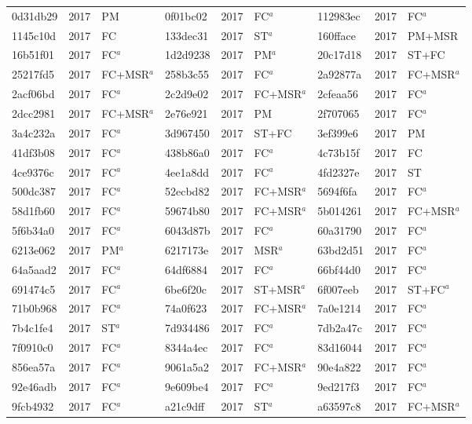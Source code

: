 \begin{longtable}{lll@{\hspace{10pt}}lll@{\hspace{10pt}}lll}
0d31db29 & 2017 & PM & 0f01bc02 & 2017 & FC$^{a}$ & 112983ec & 2017 & FC$^{a}$ \\
1145c10d & 2017 & FC & 133dec31 & 2017 & ST$^{a}$ & 160fface & 2017 & PM+MSR \\
16b51f01 & 2017 & FC$^{a}$ & 1d2d9238 & 2017 & PM$^{a}$ & 20c17d18 & 2017 & ST+FC \\
25217fd5 & 2017 & FC+MSR$^{a}$ & 258b3c55 & 2017 & FC$^{a}$ & 2a92877a & 2017 & FC+MSR$^{a}$ \\
2acf06bd & 2017 & FC$^{a}$ & 2c2d9e02 & 2017 & FC+MSR$^{a}$ & 2cfeaa56 & 2017 & FC$^{a}$ \\
2dcc2981 & 2017 & FC+MSR$^{a}$ & 2e76e921 & 2017 & PM & 2f707065 & 2017 & FC$^{a}$ \\
3a4c232a & 2017 & FC$^{a}$ & 3d967450 & 2017 & ST+FC & 3ef399e6 & 2017 & PM \\
41df3b08 & 2017 & FC$^{a}$ & 438b86a0 & 2017 & FC$^{a}$ & 4c73b15f & 2017 & FC \\
4ce9376c & 2017 & FC$^{a}$ & 4ee1a8dd & 2017 & FC$^{a}$ & 4fd2327e & 2017 & ST \\
500dc387 & 2017 & FC$^{a}$ & 52ecbd82 & 2017 & FC+MSR$^{a}$ & 5694f6fa & 2017 & FC$^{a}$ \\
58d1fb60 & 2017 & FC$^{a}$ & 59674b80 & 2017 & FC+MSR$^{a}$ & 5b014261 & 2017 & FC+MSR$^{a}$ \\
5f6b34a0 & 2017 & FC$^{a}$ & 6043d87b & 2017 & FC$^{a}$ & 60a31790 & 2017 & FC$^{a}$ \\
6213e062 & 2017 & PM$^{a}$ & 6217173e & 2017 & MSR$^{a}$ & 63bd2d51 & 2017 & FC$^{a}$ \\
64a5aad2 & 2017 & FC$^{a}$ & 64df6884 & 2017 & FC$^{a}$ & 66bf44d0 & 2017 & FC$^{a}$ \\
691474c5 & 2017 & FC$^{a}$ & 6be6f20c & 2017 & ST+MSR$^{a}$ & 6f007eeb & 2017 & ST+FC$^{a}$ \\
71b0b968 & 2017 & FC$^{a}$ & 74a0f623 & 2017 & FC+MSR$^{a}$ & 7a0e1214 & 2017 & FC$^{a}$ \\
7b4c1fe4 & 2017 & ST$^{a}$ & 7d934486 & 2017 & FC$^{a}$ & 7db2a47c & 2017 & FC$^{a}$ \\
7f0910c0 & 2017 & FC$^{a}$ & 8344a4ec & 2017 & FC$^{a}$ & 83d16044 & 2017 & FC$^{a}$ \\
856ea57a & 2017 & FC$^{a}$ & 9061a5a2 & 2017 & FC+MSR$^{a}$ & 90e4a822 & 2017 & FC$^{a}$ \\
92e46adb & 2017 & FC$^{a}$ & 9e609be4 & 2017 & FC$^{a}$ & 9ed217f3 & 2017 & FC$^{a}$ \\
9fcb4932 & 2017 & FC$^{a}$ & a21c9dff & 2017 & ST$^{a}$ & a63597c8 & 2017 & FC+MSR$^{a}$ \\

\end{longtable}
